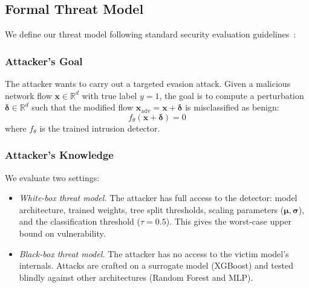 \documentclass[iicol,pdflatex,sn-mathphys-num]{sn-jnl}
\begin{document}
\subsection{Formal Threat Model}
\label{sec:threat_model}
We define our threat model following standard security evaluation guidelines~\cite{papernot2016transferability,carlini2017evaluating}:

\subsubsection{Attacker's Goal}
The attacker wants to carry out a targeted evasion attack. Given a malicious network flow $\mathbf{x} \in \mathbb{R}^d$ with true label $y = 1$, the goal is to compute a perturbation $\boldsymbol{\delta} \in \mathbb{R}^d$ such that the modified flow $\mathbf{x}_{\text{adv}} = \mathbf{x} + \boldsymbol{\delta}$ is misclassified as benign:
\begin{equation}
    f_\theta(\mathbf{x} + \boldsymbol{\delta}) = 0
\end{equation}
where $f_\theta$ is the trained intrusion detector.

\subsubsection{Attacker's Knowledge}
We evaluate two settings:
\begin{itemize}
    \item \textit{White-box threat model.} The attacker has full access to the detector: model architecture, trained weights, tree split thresholds, scaling parameters ($\boldsymbol{\mu}, \boldsymbol{\sigma}$), and the classification threshold ($\tau = 0.5$). This gives the worst-case upper bound on vulnerability.
    \item \textit{Black-box threat model.} The attacker has no access to the victim model's internals. Attacks are crafted on a surrogate model (XGBoost) and tested blindly against other architectures (Random Forest and MLP).
\end{itemize}
\end{document}
